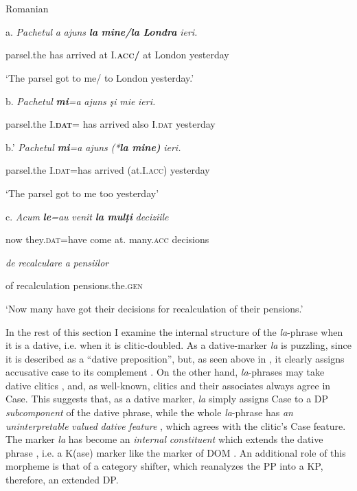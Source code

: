 \documentclass[output=paper,modfonts,nonflat]{langsci/langscibook}
\begin{document}
\ea%
    \label{ex:key:11}
    \gll\\
        \\
    \glt
    \z

          Romanian

  a.  \textit{Pachetul}   \textit{a} \textit{ajuns}    \textbf{\textit{la} \textit{mine/la} \textit{Londra}}  \textit{ieri.}

    parsel.the  has arrived   at I.\textbf{\textsc{acc}}\textbf{/} at London  yesterday

    ‘The parsel got to me/ to London yesterday.’

  b.  \textit{Pachetul}  \textbf{\textit{mi}}\textit{=a}    \textit{ajuns}  \textit{şi}     \textit{mie}  \textit{ieri.}

    parsel.the  I.\textbf{\textsc{dat}}= has   arrived   also I.\textsc{dat}  yesterday

  b.’  \textit{Pachetul}  \textbf{\textit{mi}}\textit{=a}     \textit{ajuns}  \textit{(*}\textbf{\textit{la} \textit{mine)}}  \textit{ieri.}

    parsel.the  I.\textsc{dat}=has  arrived  (at.I.\textsc{acc})  yesterday

    ‘The parsel  got to me too yesterday’

  c.  \textit{Acum}   \textbf{\textit{le}}\textit{=au}   \textit{venit}     \textbf{\textit{la} \textit{mulți}}    \textit{deciziile}  

now  they.\textsc{dat}=have come  at. many.\textsc{acc}  decisions 

\textit{de}  \textit{recalculare}    \textit{a} \textit{pensiilor}

of  recalculation  pensions.the.\textsc{gen}

‘Now many have got their decisions for recalculation of their pensions.’

In the rest of this section I examine the internal structure of the \textit{la}{}-phrase when it is a dative, i.e. when it is clitic-doubled. As a dative-marker \textit{la} is puzzling, since it is described as a “dative preposition”, but, as seen above in , it clearly assigns accusative case to its complement . On the other hand, \textit{la}{}-phrases may take dative clitics , and, as well-known, clitics and their associates always agree in Case. This suggests that, as a dative marker, \textit{la} simply assigns Case to a DP \textit{subcomponent} of the dative phrase, while the whole \textit{la}{}-phrase has \textit{an} \textit{uninterpretable} \textit{valued} \textit{dative} \textit{feature} , which agrees with the clitic’s Case feature. The marker \textit{la} has become an \textit{internal} \textit{constituent} which extends the dative phrase , i.e. a K(ase) marker like the marker of DOM \citep{Lopez2011}. An additional role of this morpheme is that of a category shifter, which reanalyzes the PP into a KP, therefore, an extended DP.
\end{document}
